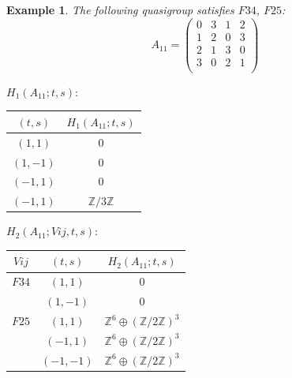 \documentclass[11pt]{amsart}
\newtheorem{example}[theorem]{Example}
\theoremstyle{definition}
\newcommand{\Z}{\mathbb{Z}}
\begin{document}
\begin{example}
The following quasigroup satisfies 
$F34$, $F25$:
   \[ A_{11} = \left(
\begin{array}{cccc}
 0 & 3 & 1 & 2 \\
 1 & 2 & 0 & 3 \\
 2 & 1 & 3 & 0 \\
 3 & 0 & 2 & 1 \\
\end{array}
\right)\]


\bigskip


$H_1(A_{11};t,s):$

\begin{center}
    
\begin{tabular}{c|c}
    $(t,s)$ & $H_1(A_{11};t,s)$  \\
    \hline
    $(1,1)$ & $0$ \\
    $(1,-1)$ & $0$ \\
    $(-1,1)$ & $0$ \\
    $(-1,1)$ & $\Z/3\Z$ \\
\end{tabular}
\end{center}
\bigskip

$H_2(A_{11};Vij,t,s):$

\begin{center}
    
\begin{tabular}{c|c|c}
    $Vij$ & $(t,s)$ & $H_2(A_{11};t,s)$  \\
    \hline

    $F34$ & $(1,1)$ & $0$ \\
        & $(1,-1)$ & $0$ \\
    $F25$ & $(1,1)$ & $\Z^6 \oplus (\Z/2\Z)^3$ \\
          & $(-1,1)$ & $\Z^6 \oplus (\Z/2\Z)^3$ \\
          & $(-1,-1)$ & $\Z^6 \oplus (\Z/2\Z)^3$ \\
\end{tabular}
\end{center}
\end{example}
\end{document}
